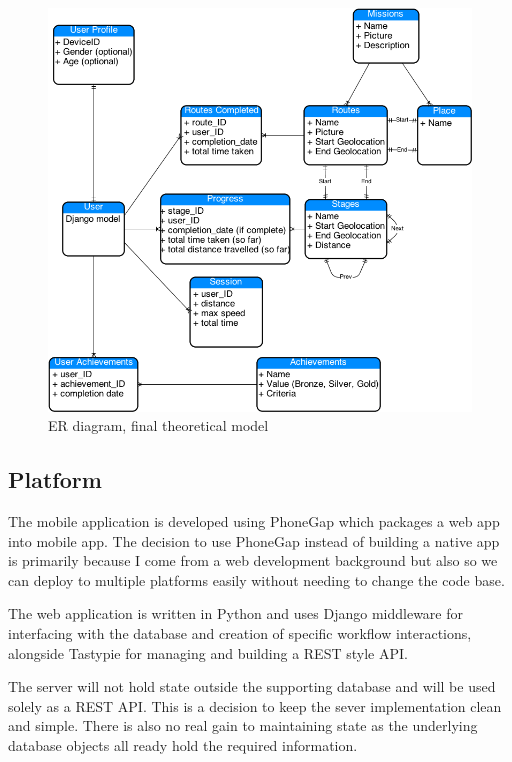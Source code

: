 \begin{figure}[h]
  \centering
  \includegraphics[width=\linewidth]{images/ER.png}
  \caption{ER diagram, final theoretical model}
  \label{ER_1}
\end{figure}


\subsection{Platform}
The mobile application is developed using PhoneGap which packages a
web app into mobile app. The decision to use PhoneGap instead of
building a native app is primarily because I come from a web
development background but also so we can deploy to multiple platforms easily
without needing to change the code base.

The web application is written in Python and uses Django middleware
for interfacing with the database and creation of specific workflow
interactions, alongside Tastypie for managing and building a REST
style API.

The server will not hold state outside the supporting database and
will be used solely as a REST API. This is a decision to keep the
sever implementation clean and simple. There is also no real gain to
maintaining state as the underlying database objects all ready hold
the required information.

